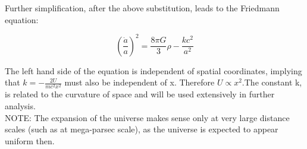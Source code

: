\documentclass{beamer}
\begin{document}
\begin{frame}[allowframebreaks]
Further simplification, after the above substitution, leads to the Friedmann equation:

\begin{equation} \label{eq:1}
(\frac{\dot{a}}{a})^2 = \frac{8{\pi}G}{3}\rho -\frac{kc^2}{a^2}
\end{equation}

The left hand side of the equation is independent of spatial coordinates, implying that $k = -\frac{2U}{m{c^2}{x^2}}$ must also be independent of x. Therefore $U \propto {x^2}$.The constant k, is related to the curvature of space and will be used extensively in further analysis. \\

NOTE: The expansion of the universe makes sense only at very large distance scales (such as at mega-parsec scale), as the universe is expected to appear uniform then. 

\end{frame}
\end{document}
